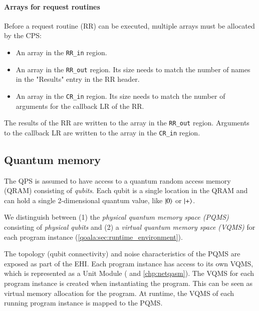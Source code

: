 \paragraph{Arrays for request routines}
Before a request routine (RR) can be executed, multiple arrays must be allocated by the CPS:
\begin{itemize}
\item An array in the \texttt{RR\_in} region. 
\item An array in the \texttt{RR\_out} region. Its size needs to match the number of names in the "Results" entry in the RR header.
\item An array in the \texttt{CR\_in} region. Its size needs to match the number of arguments for the callback LR of the RR.
\end{itemize}

The results of the RR are written to the array in the \mbox{\texttt{RR\_out}} region. Arguments to the callback LR are written to the array in the \texttt{CR\_in} region.



\subsection{Quantum memory}
\label{qoala:sec:app:quantum_memory}
The QPS is assumed to have access to a quantum random access memory (QRAM) consisting of \textit{qubits}.
Each qubit is a single location in the QRAM and can hold a single 2-dimensional quantum value, like $\ket{0}$ or $\ket{+}$.

We distinguish between (1) the \textit{physical quantum memory space (PQMS)} consisting of \textit{physical qubits}
and (2) a \textit{virtual quantum memory space (VQMS)} for each program instance (\cref{qoala:sec:runtime_environment}).

The topology (qubit connectivity) and noise characteristics of the PQMS are exposed as part of the EHI.
Each program instance has access to its own VQMS, which is represented as a Unit Module (\cite{dahlberg2022netqasm} and \cref{chp:netqasm}).
The VQMS for each program instance is created when instantiating the program.
This can be seen as virtual memory allocation for the program.
At runtime, the VQMS of each running program instance is mapped to the PQMS.

